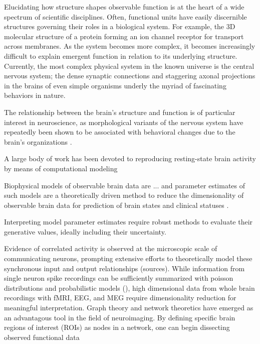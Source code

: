 Elucidating how structure shapes observable function is at the heart of a wide spectrum of scientific disciplines. Often, functional units have easily discernible structures governing their roles in a biological system. For example, the 3D molecular structure of a protein forming an ion channel receptor for transport across membranes. As the system becomes more complex, it becomes increasingly difficult to explain emergent function in relation to its underlying structure. Currently, the most complex physical system in the known universe is the central nervous system; the dense synaptic connections and staggering axonal projections in the brains of even simple organisms underly the myriad of fascinating behaviors in nature.

The relationship between the brain's structure and function is of particular interest in neuroscience, as morphological variants of the nervous system have repeatedly been shown to be associated with behavioral changes due to the brain's organizations \cite{sharp_default_2011, shen_using_2017}. 

A large body of work has been devoted to reproducing resting-state brain activity by means of computational modeling

Biophysical models of observable brain data are ... and parameter estimates of such models are a theoretically driven method to reduce the dimensionality of observable brain data for prediction of brain states and clinical statuses \cite{huys_computational_2016}.

Interpreting model parameter estimates require robust methods to evaluate their generative values, ideally including their uncertainty. 


Evidence of correlated activity is observed at the microscopic scale of communicating neurons, prompting extensive efforts to theoretically model these synchronous input  and output relationships (sources). While information from single neuron spike recordings can be sufficiently summarized with poisson distributions and probabilistic models (), high dimensional data from whole brain recordings with fMRI, EEG, and MEG require dimensionality reduction for meaningful interpretation. Graph theory and network theoretics have emerged as an advantagous tool in the field of neuroimaging. By defining specific brain regions of interest (ROIs) as nodes in a network, one can begin dissecting observed functional data 

